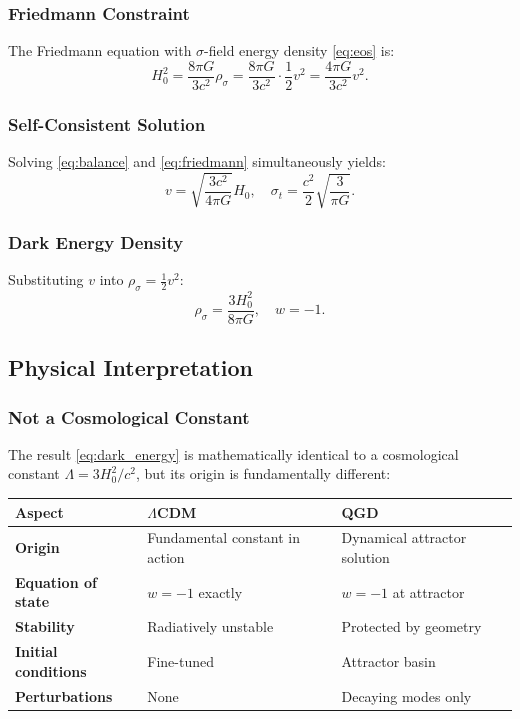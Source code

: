 \documentclass[11pt,a4paper]{article}
\theoremstyle{definition}
\theoremstyle{remark}
\begin{document}
	\subsubsection{Friedmann Constraint}
	The Friedmann equation with $\sigma$-field energy density \eqref{eq:eos} is:
	\begin{equation}
		H_0^2 = \frac{8\pi G}{3c^2} \rho_\sigma = \frac{8\pi G}{3c^2} \cdot \frac{1}{2} v^2 = \frac{4\pi G}{3c^2} v^2.
		\label{eq:friedmann}
	\end{equation}
	
	\subsubsection{Self-Consistent Solution}
	Solving \eqref{eq:balance} and \eqref{eq:friedmann} simultaneously yields:
	\begin{equation}
		\boxed{v = \sqrt{\frac{3c^2}{4\pi G}} H_0}, \quad \boxed{\sigma_t = \frac{c^2}{2} \sqrt{\frac{3}{\pi G}}}.
		\label{eq:attractor}
	\end{equation}
	
	\subsubsection{Dark Energy Density}
	Substituting $v$ into $\rho_\sigma = \frac{1}{2} v^2$:
	\begin{equation}
		\boxed{\rho_\sigma = \frac{3H_0^2}{8\pi G}}, \quad \boxed{w = -1}.
		\label{eq:dark_energy}
	\end{equation}
	
	\subsection{Physical Interpretation}
	
	\subsubsection{Not a Cosmological Constant}
	The result \eqref{eq:dark_energy} is mathematically identical to a cosmological constant $\Lambda = 3H_0^2/c^2$, but its origin is fundamentally different:
	
	\begin{center}
		\begin{tabular}{|l|l|l|}
			\hline
			\textbf{Aspect} & \textbf{$\Lambda$CDM} & \textbf{QGD} \\
			\hline
			\textbf{Origin} & Fundamental constant in action & Dynamical attractor solution \\
			\textbf{Equation of state} & $w = -1$ exactly & $w = -1$ at attractor \\
			\textbf{Stability} & Radiatively unstable & Protected by geometry \\
			\textbf{Initial conditions} & Fine-tuned & Attractor basin \\
			\textbf{Perturbations} & None & Decaying modes only \\
			\hline
		\end{tabular}
	\end{center}
	
\end{document}
